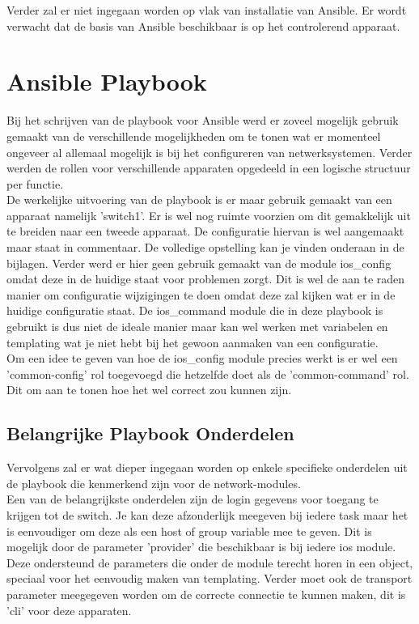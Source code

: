 Verder zal er niet ingegaan worden op vlak van installatie van Ansible. Er wordt verwacht dat de basis van Ansible beschikbaar is op het controlerend apparaat.

\section{Ansible Playbook}
\label{ch:ansibleplaybook}
Bij het schrijven van de playbook voor Ansible werd er zoveel mogelijk gebruik gemaakt van de verschillende mogelijkheden om te tonen wat er momenteel ongeveer al allemaal mogelijk is bij het configureren van netwerksystemen. Verder werden de rollen voor verschillende apparaten opgedeeld in een logische structuur per functie. 
\\

De werkelijke uitvoering van de playbook is er maar gebruik gemaakt van een apparaat namelijk 'switch1'. Er is wel nog ruimte voorzien om dit gemakkelijk uit te breiden naar een tweede apparaat. De configuratie hiervan is wel aangemaakt maar staat in commentaar. De volledige opstelling kan je vinden onderaan in de bijlagen. Verder werd er hier geen gebruik gemaakt van de module ios\_config omdat deze in de huidige staat voor problemen zorgt. Dit is wel de aan te raden manier om configuratie wijzigingen te doen omdat deze zal kijken wat er in de huidige configuratie staat. De ios\_command module die in deze playbook is gebruikt is dus niet de ideale manier maar kan wel werken met variabelen en templating wat je niet hebt bij het gewoon aanmaken van een configuratie.
\\

Om een idee te geven van hoe de ios\_config module precies werkt is er wel een 'common-config' rol toegevoegd die hetzelfde doet als de 'common-command' rol. Dit om aan te tonen hoe het wel correct zou kunnen zijn.

\subsection{Belangrijke Playbook Onderdelen}
\label{ch:ansibleplaybookonderdelen}
Vervolgens zal er wat dieper ingegaan worden op enkele specifieke onderdelen uit de playbook die kenmerkend zijn voor de network-modules.
\\

Een van de belangrijkste onderdelen zijn de login gegevens voor toegang te krijgen tot de switch. Je kan deze afzonderlijk meegeven bij iedere task maar het is eenvoudiger om deze als een host of group variable mee te geven. Dit is mogelijk door de parameter 'provider' die beschikbaar is bij iedere ios module. Deze ondersteund de parameters die onder de module terecht horen in een object, speciaal voor het eenvoudig maken van templating. Verder moet ook de transport parameter meegegeven worden om de correcte connectie te kunnen maken, dit is 'cli' voor deze apparaten.
\\

